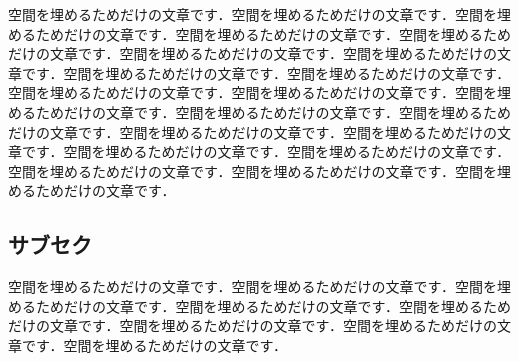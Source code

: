 \documentclass[10pt, a4j, uplatex, dvipdfmx, twocolumn]{jsarticle}
\begin{document}
空間を埋めるためだけの文章です．空間を埋めるためだけの文章です．空間を埋めるためだけの文章です．空間を埋めるためだけの文章です．空間を埋めるためだけの文章です．空間を埋めるためだけの文章です．空間を埋めるためだけの文章です．空間を埋めるためだけの文章です．空間を埋めるためだけの文章です．空間を埋めるためだけの文章です．空間を埋めるためだけの文章です．空間を埋めるためだけの文章です．空間を埋めるためだけの文章です．空間を埋めるためだけの文章です．空間を埋めるためだけの文章です．空間を埋めるためだけの文章です．空間を埋めるためだけの文章です．空間を埋めるためだけの文章です．空間を埋めるためだけの文章です．空間を埋めるためだけの文章です．空間を埋めるためだけの文章です．

\subsection{サブセク}

空間を埋めるためだけの文章です．空間を埋めるためだけの文章です．空間を埋めるためだけの文章です．空間を埋めるためだけの文章です．空間を埋めるためだけの文章です．空間を埋めるためだけの文章です．空間を埋めるためだけの文章です．空間を埋めるためだけの文章です．
\end{document}
